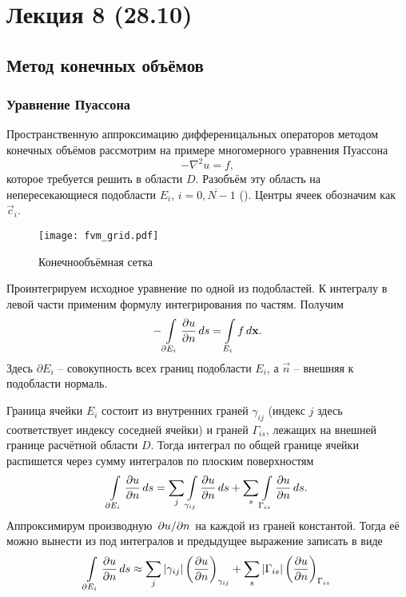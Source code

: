 \section{Лекция 8 (28.10)}

\subsection{Метод конечных объёмов}
\subsubsection{Уравнение Пуассона}
Пространственную аппроксимацию дифференицальных операторов
методом конечных объёмов рассмотрим на примере многомерного уравнения Пуассона
\begin{equation}
\label{eq:fvm_pois}
-\nabla^2 u = f,
\end{equation}
которое требуется решить в области $D$. Разобъём эту область
на непересекающиеся подобласти $E_i$, $i = \overline{0, N-1}$ ().
Центры ячеек обозначим как $\vec c_i$.


\begin{figure}[h!]
\centering
\texttt{[image: fvm\_grid.pdf]}
\caption{Конечнообъёмная сетка}
\label{fig:fvm_grid}
\end{figure}

Проинтегрируем исходное уравнение
по одной из подобластей. К интегралу в левой части применим формулу интегрирования по частям. Получим
\begin{equation}
\label{eq:fvm_pois_int}
-\arint{\dfr{u}{n}}{\partial E_i}{s} = \arint{f}{E_i}{\vec x}.
\end{equation}
Здесь $\partial E_i$ -- совокупность всех границ подобласти $E_i$,
а $\vec n$ -- внешняя к подобласти нормаль.

Граница ячейки $E_i$ состоит из внутренних граней $\gamma_{ij}$ (индекс $j$ здесь
соответствует индексу соседней ячейки)
и граней $\Gamma_{is}$, лежащих на внешней границе расчётной области $D$.
Тогда интеграл по общей границе ячейки распишется через сумму интегралов по плоским поверхностям
$$
\arint{\dfr{u}{n}}{\partial E_i}{s} = \sum_j\arint{\dfr{u}{n}}{\gamma_{ij}}{s} + \sum_s\arint{\dfr{u}{n}}{\Gamma_{is}}{s}.
$$
Аппроксимирум производную $\dsfr{u}{n}$ на каждой из граней константой.
Тогда её можно вынести из под интегралов и предыдущее выражение записать в виде
\begin{equation}
\label{eq:fvm_gamma_integral}
\arint{\dfr{u}{n}}{\partial E_i}{s} \approx
\sum_j
    \left|
        \gamma_{ij}
    \right|
    \left(
        \dfr{u}{n}
    \right)_{\gamma_{ij}}
+\sum_s
    \left|
        \Gamma_{is}
    \right|
    \left(
        \dfr{u}{n}
    \right)_{\Gamma_{is}}
\end{equation}

